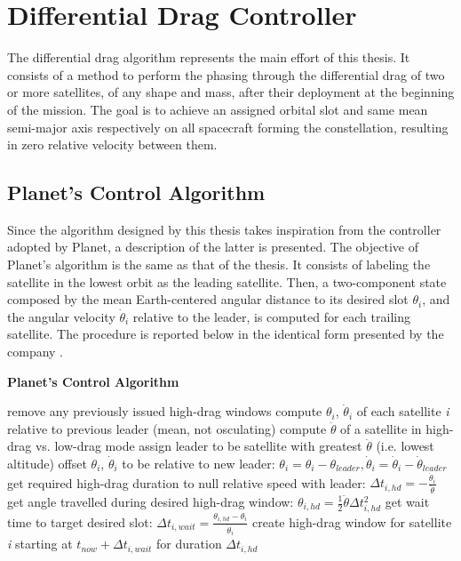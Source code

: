 \section{Differential Drag Controller}
The differential drag algorithm represents the main effort of this thesis.
It consists of a method to perform the phasing through the differential drag of two or more satellites, of any shape and mass, after their deployment at the beginning of the mission.
The goal is to achieve an assigned orbital slot and same mean semi-major axis respectively on all spacecraft forming the constellation, resulting in zero relative velocity between them.

\subsection{Planet's Control Algorithm}
Since the algorithm designed by this thesis takes inspiration from the controller adopted by Planet, a description of the latter is presented.
The objective of Planet's algorithm is the same as that of the thesis.
It consists of labeling the satellite in the lowest orbit as the leading satellite.
Then, a two-component state composed by the mean Earth-centered angular distance to its desired slot $\theta_i$, and the angular velocity $\dot{\theta}_i$ relative to the leader, is computed for each trailing satellite.
The procedure is reported below in the identical form presented by the company \cite{foster2015orbit}.

\begin{algorithm}[H]
      \caption{\textbf{Planet's Control Algorithm}}
      \begin{algorithmic}[1]
                  \State remove any previously issued high-drag windows
                  \State compute $\theta_i$, $\dot{\theta}_i$ of each satellite \textit{i} relative to previous leader (mean, not osculating)
                  \State compute $\ddot{\theta}$ of a satellite in high-drag vs. low-drag mode
                  \State assign leader to be satellite with greatest $\dot{\theta}$ (i.e. lowest altitude)
                        \State offset $\theta_i$, $\dot{\theta}_i$ to be relative to new leader: $\theta_i = \theta_i - \theta_{leader}, \dot{\theta}_i = \dot{\theta}_i - \dot{\theta}_{leader}$
                        \State get required high-drag duration to null relative speed with leader: $\Delta t_{i,hd} = - \frac{\dot{\theta}_i}{\ddot{\theta}}$
                        \State get angle travelled during desired high-drag window: $\theta_{i,hd} = \frac{1}{2} \ddot{\theta} \Delta t_{i,hd}^2$
                        \State get wait time to target desired slot: $\Delta t_{i,wait} = \frac{\theta_{i,hd} - \theta_i}{\dot{\theta}_i}$
                        \State create high-drag window for satellite \textit{i} starting at $t_{now} + \Delta t_{i,wait}$ for duration $\Delta t_{i,hd}$
                  \EndFor
            \EndProcedure
      \end{algorithmic}
\end{algorithm}


